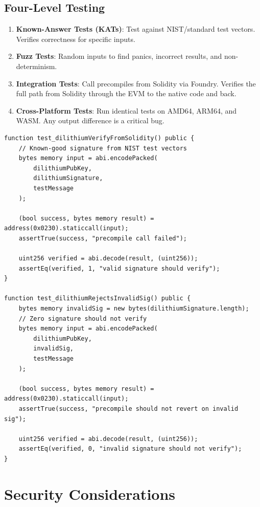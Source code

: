 \documentclass[11pt,a4paper]{article}
\begin{document}
\subsection{Four-Level Testing}

\begin{enumerate}
  \item \textbf{Known-Answer Tests (KATs)}: Test against NIST/standard test vectors.
    Verifies correctness for specific inputs.
  \item \textbf{Fuzz Tests}: Random inputs to find panics, incorrect results, and
    non-determinism.
  \item \textbf{Integration Tests}: Call precompiles from Solidity via Foundry. Verifies
    the full path from Solidity through the EVM to the native code and back.
  \item \textbf{Cross-Platform Tests}: Run identical tests on AMD64, ARM64, and WASM.
    Any output difference is a critical bug.
\end{enumerate}

\begin{lstlisting}[language=Solidity,caption={Integration test for post-quantum verification}]
function test_dilithiumVerifyFromSolidity() public {
    // Known-good signature from NIST test vectors
    bytes memory input = abi.encodePacked(
        dilithiumPubKey,
        dilithiumSignature,
        testMessage
    );

    (bool success, bytes memory result) = address(0x0230).staticcall(input);
    assertTrue(success, "precompile call failed");

    uint256 verified = abi.decode(result, (uint256));
    assertEq(verified, 1, "valid signature should verify");
}

function test_dilithiumRejectsInvalidSig() public {
    bytes memory invalidSig = new bytes(dilithiumSignature.length);
    // Zero signature should not verify
    bytes memory input = abi.encodePacked(
        dilithiumPubKey,
        invalidSig,
        testMessage
    );

    (bool success, bytes memory result) = address(0x0230).staticcall(input);
    assertTrue(success, "precompile should not revert on invalid sig");

    uint256 verified = abi.decode(result, (uint256));
    assertEq(verified, 0, "invalid signature should not verify");
}
\end{lstlisting}

\section{Security Considerations}
\end{document}
